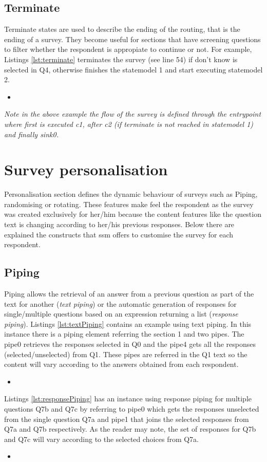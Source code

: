 \documentclass{article}
\newcommand{\insertcode}[3]{\begin{itemize}\item[]\end{itemize}} %
\begin{document}
	\subsection{Terminate}
	Terminate states are used to describe the ending of the routing, that is the ending of a survey. They become useful for sections that have screening questions to filter whether the respondent is appropiate to continue or not. For example, Listings \ref{lst:terminate} terminates the survey (see line 54) if don't know is selected in Q4, otherwise finishes the statemodel 1 and start executing statemodel 2.
\insertcode{"scripts/terminate.xml"}{Terminate state example}{lst:terminate}
\emph{Note in the above example the flow of the survey is defined through the entrypoint where first is executed c1, after c2 (if terminate is not reached in statemodel 1) and finally sink0.}

\section{Survey personalisation}
Personalisation section defines the dynamic behaviour of surveys such as Piping, randomising or rotating. These features make feel the respondent as the survey was created exclusively for her/him because the content features like the question text is changing according to her/his previous responses. Below there are explained the constructs that \gls{ssm} offers to customise the survey for each respondent.
	\subsection{Piping} Piping allows the retrieval of an answer from a previous question as part of the text for another (\emph{text piping}) or the automatic generation of responses for single/multiple questions based on an expression returning a list (\emph{response piping}).
Listings \ref{lst:textPiping} contains an example using text piping. In this instance there is a piping element referring the section 1 and two pipes. The pipe0 retrieves the responses selected in Q0 and the pipe4 gets all the responses (selected/unselected) from Q1. These pipes are referred in the Q1 text so the content will vary according to the answers obtained from each respondent.
\insertcode{"scripts/text_piping.xml"}{Text piping example}{lst:textPiping}
Listings \ref{lst:responsePiping} has an instance using response piping for multiple questions Q7b and Q7c by referring to pipe0 which gets the responses unselected from the single question Q7a and pipe1 that joins the selected responses from Q7a and Q7b respectively. As the reader may note, the set of responses for Q7b and Q7c will vary according to the selected choices from Q7a.
\insertcode{"scripts/response_piping.xml"}{Response piping example}{lst:responsePiping}
\end{document}
